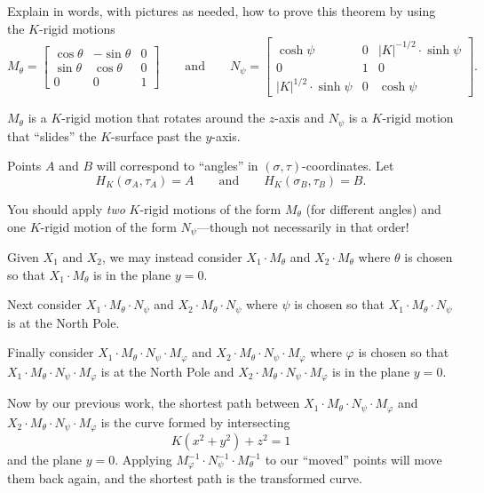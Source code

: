 \documentclass[handout,newpage,hints,,12pt,noauthor,nooutcomes]{ximera}
\begin{document}
\begin{problem}
  Explain in words, with pictures as needed, how to prove this theorem
  by using the $K$-rigid motions
  \[
  M_\theta=
  \begin{bmatrix}
    \cos\theta & -\sin\theta & 0\\
    \sin\theta & \cos\theta & 0\\
    0 & 0 & 1
  \end{bmatrix}
  \qquad\text{and}\qquad
  N_\psi=
  \begin{bmatrix}
    \cosh\psi & 0 & |K|^{-1/2}\cdot\sinh\psi\\
    0 & 1 & 0\\
    |K|^{1/2}\cdot\sinh\psi & 0 & \cosh\psi
  \end{bmatrix}.
  \]
  \begin{hint}
    $M_\theta$ is a $K$-rigid motion that rotates around the $z$-axis and $N_\psi$
    is a $K$-rigid motion that ``slides'' the $K$-surface past the $y$-axis.
  \end{hint}
  \begin{hint}
    Points $A$ and $B$ will correspond to ``angles'' in
    $(\sigma,\tau)$-coordinates. Let
    \[
    H_K(\sigma_A,\tau_A) = A\qquad\text{and}\qquad H_K(\sigma_B,\tau_B) = B.
    \]
  \end{hint}
  \begin{hint}
    You should apply \textit{two} $K$-rigid motions of the form
    $M_\theta$ (for different angles) and one $K$-rigid motion of the
    form $N_\psi$---though not necessarily in that order!
  \end{hint}
  \begin{freeResponse}
    Given $X_1$ and $X_2$, we may instead consider $X_1\cdot M_\theta$
    and $X_2\cdot M_\theta$ where $\theta$ is chosen so that $X_1\cdot
    M_\theta$ is in the plane $y=0$.

    Next consider $X_1\cdot M_\theta\cdot N_\psi$ and $X_2\cdot
    M_\theta\cdot N_\psi$ where $\psi$ is chosen so that $X_1\cdot
    M_\theta\cdot N_\psi$ is at the North Pole.

    Finally consider $X_1\cdot M_\theta\cdot N_\psi\cdot M_\varphi$
    and $X_2\cdot M_\theta\cdot N_\psi\cdot M_\varphi$ where $\varphi$
    is chosen so that $X_1\cdot M_\theta\cdot N_\psi\cdot M_\varphi$
    is at the North Pole and $X_2\cdot M_\theta\cdot N_\psi\cdot
    M_\varphi$ is in the plane $y=0$.

    Now by our previous work, the shortest path between $X_1\cdot
    M_\theta\cdot N_\psi\cdot M_\varphi$ and $X_2\cdot M_\theta\cdot
    N_\psi\cdot M_\varphi$ is the curve formed by intersecting
    \[
    K(x^2+y^2)+z^2=1
    \]
    and the plane $y=0$. Applying $M_\varphi^{-1}\cdot
    N_\psi^{-1}\cdot M_\theta^{-1}$ to our ``moved'' points will move
    them back again, and the shortest path is the transformed curve.
  \end{freeResponse}
\end{problem}
\end{document}
